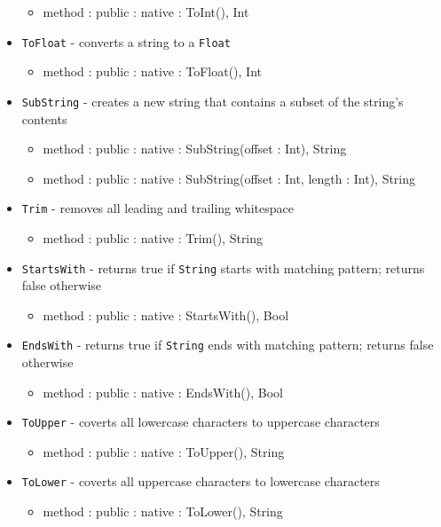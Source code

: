 \documentclass[12pt]{article}
\begin{document}
\begin{itemize}
    	\begin{itemize}
	\item method : public : native : ToInt(), Int
	\end{itemize}
    \item \texttt{ToFloat} - converts a string to a \texttt{Float}
    	\begin{itemize}
	\item method : public : native : ToFloat(), Int
	\end{itemize}
    \item \texttt{SubString} - creates a new string that contains a subset of the string's contents
    	\begin{itemize}
	\item method : public : native : SubString(offset : Int), String
	\item method : public : native : SubString(offset : Int, length : Int), String
	\end{itemize}
    \item \texttt{Trim} - removes all leading and trailing whitespace
    	\begin{itemize}
	\item method : public : native : Trim(), String
	\end{itemize}
    \item \texttt{StartsWith} - returns true if \texttt{String} starts with matching pattern; returns false otherwise
    	\begin{itemize}
	\item method : public : native : StartsWith(), Bool
	\end{itemize}
    \item \texttt{EndsWith} - returns true if \texttt{String} ends with matching pattern; returns false otherwise
    	\begin{itemize}
	\item method : public : native : EndsWith(), Bool
	\end{itemize}
    \item \texttt{ToUpper} - coverts all lowercase characters to uppercase characters
    	\begin{itemize}
	\item method : public : native : ToUpper(), String
	\end{itemize}
    \item \texttt{ToLower} - coverts all uppercase characters to lowercase characters
    	\begin{itemize}
	\item method : public : native : ToLower(), String

\end{itemize}
\end{itemize}
\end{document}
